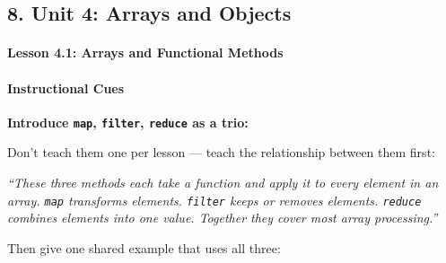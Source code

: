 \documentclass[
  justified,
  openright,
]{tufte-book}
\let\subsubsection\paragraph
\let\paragraph\paragraph
\let\subsubsection\paragraph
\let\paragraph\paragraph
\begin{document}
\subsection{8. Unit 4: Arrays and
Objects}\label{unit-4-arrays-and-objects}

\subsubsection{Lesson 4.1: Arrays and Functional
Methods}\label{lesson-4.1-arrays-and-functional-methods}

\paragraph{Instructional Cues}\label{instructional-cues-4}

\textbf{Introduce \texttt{map}, \texttt{filter}, \texttt{reduce} as a
trio:}

Don't teach them one per lesson --- teach the relationship between them
first:

\emph{``These three methods each take a function and apply it to every
element in an array. \texttt{map} transforms elements. \texttt{filter}
keeps or removes elements. \texttt{reduce} combines elements into one
value. Together they cover most array processing.''}

Then give one shared example that uses all three:
\end{document}
